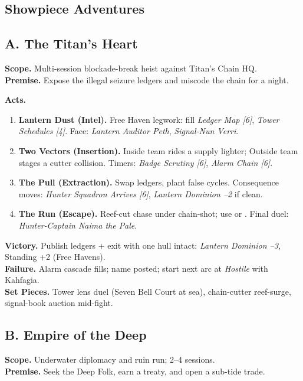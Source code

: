 \documentclass[11pt,oneside]{book}
\newcommand{\tagpill}[1]{\begingroup
  \setlength{\fboxsep}{1pt}\color{black}\fbox{\footnotesize\textsf{#1}}
\endgroup}
\begin{document}
\begin{itemize}
\section{Showpiece Adventures}

\subsection*{A. The Titan's Heart}
\textbf{Scope.} Multi-session blockade-break heist against Titan's Chain HQ.\\
\textbf{Premise.} Expose the illegal seizure ledgers and miscode the chain for a night.

\textbf{Acts.}
\begin{enumerate}[leftmargin=*,itemsep=2pt]
  \item \textbf{Lantern Dust (Intel).} Free Haven legwork: fill \emph{Ledger Map [6]}, \emph{Tower Schedules [4]}. Face: \emph{Lantern Auditor Peth}, \emph{Signal-Nun Verri}.
  \item \textbf{Two Vectors (Insertion).} Inside team rides a supply lighter; Outside team stages a cutter collision. Timers: \emph{Badge Scrutiny [6]}, \emph{Alarm Chain [6]}.
  \item \textbf{The Pull (Extraction).} Swap ledgers, plant false cycles. Consequence moves: \emph{Hunter Squadron Arrives [6]}, \emph{Lantern Dominion --2} if clean.
  \item \textbf{The Run (Escape).} Reef-cut chase under chain-shot; use \tagpill{GHOST CONVOY} or \tagpill{SPIRIT MASK}. Final duel: \emph{Hunter-Captain Naima the Pale}.
\end{enumerate}

\textbf{Victory.} Publish ledgers + exit with one hull intact: \emph{Lantern Dominion --3}, Standing +2 (Free Havens).\\
\textbf{Failure.} Alarm cascade fills; name posted; start next arc at \emph{Hostile} with Kahfagia.\\
\textbf{Set Pieces.} Tower lens duel (Seven Bell Court at sea), chain-cutter reef-surge, signal-book auction mid-fight.

\subsection*{B. Empire of the Deep}
\textbf{Scope.} Underwater diplomacy and ruin run; 2--4 sessions.\\
\textbf{Premise.} Seek the Deep Folk, earn a treaty, and open a sub-tide trade.


\end{itemize}
\end{document}
